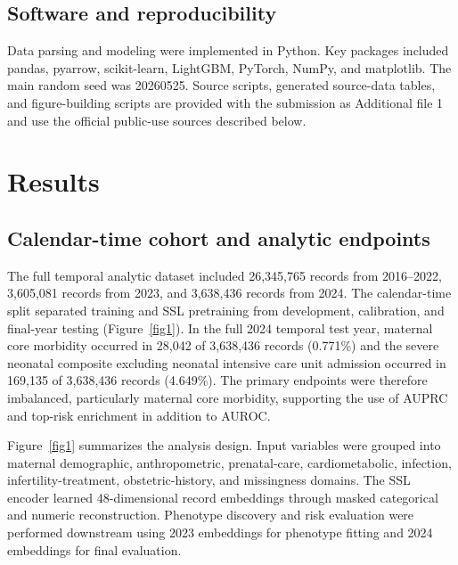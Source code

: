 \documentclass[pdflatex,sn-vancouver-num]{sn-jnl}
\begin{document}
\subsection{Software and reproducibility}\label{subsec:software}

Data parsing and modeling were implemented in Python. Key packages included pandas, pyarrow, scikit-learn, LightGBM, PyTorch, NumPy, and matplotlib. The main random seed was 20260525. Source scripts, generated source-data tables, and figure-building scripts are provided with the submission as Additional file 1 and use the official public-use sources described below.

\section{Results}\label{sec:results}

\subsection{Calendar-time cohort and analytic endpoints}\label{subsec:calendar-results}

The full temporal analytic dataset included 26,345,765 records from 2016--2022, 3,605,081 records from 2023, and 3,638,436 records from 2024. The calendar-time split separated training and SSL pretraining from development, calibration, and final-year testing (Figure~\ref{fig1}). In the full 2024 temporal test year, maternal core morbidity occurred in 28,042 of 3,638,436 records (0.771\%) and the severe neonatal composite excluding neonatal intensive care unit admission occurred in 169,135 of 3,638,436 records (4.649\%). The primary endpoints were therefore imbalanced, particularly maternal core morbidity, supporting the use of AUPRC and top-risk enrichment in addition to AUROC.

Figure~\ref{fig1} summarizes the analysis design. Input variables were grouped into maternal demographic, anthropometric, prenatal-care, cardiometabolic, infection, infertility-treatment, obstetric-history, and missingness domains. The SSL encoder learned 48-dimensional record embeddings through masked categorical and numeric reconstruction. Phenotype discovery and risk evaluation were performed downstream using 2023 embeddings for phenotype fitting and 2024 embeddings for final evaluation.
\end{document}

